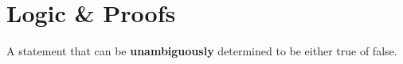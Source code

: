\section{Logic \& Proofs}

\begin{definition}[Proposition]
    A statement that can be \textbf{unambiguously} determined to be either true of false.
\end{definition}